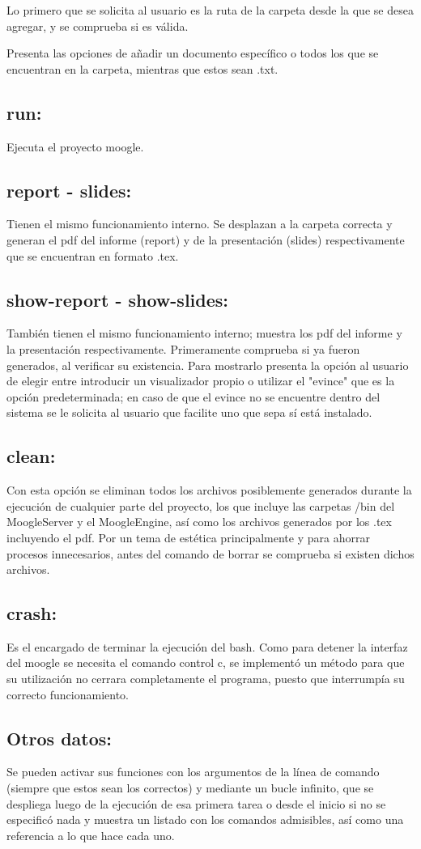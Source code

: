 \documentclass[a4paper,12pt,]{article}
\begin{document}
Lo primero que se solicita al usuario es la ruta de la carpeta desde la que se desea agregar, y se comprueba si 
es válida.

Presenta las opciones de añadir un documento específico o todos los que se encuentran en la carpeta, mientras que 
estos sean .txt.

\subsection*{run: }
Ejecuta el proyecto moogle.

\subsection*{report - slides: }
Tienen el mismo funcionamiento interno. Se desplazan a la carpeta correcta y generan el pdf del informe (report) y de 
la presentación (slides) respectivamente que se encuentran en formato .tex.

\subsection*{show-report - show-slides: }
También tienen el mismo funcionamiento interno; muestra los pdf del informe y la presentación respectivamente. 
Primeramente comprueba si ya fueron generados, al verificar su existencia. Para mostrarlo presenta la opción al 
usuario de elegir entre introducir un visualizador propio o utilizar el "evince" que es la opción predeterminada; 
en caso de que el evince no se encuentre dentro del sistema se le solicita al usuario que facilite uno que sepa sí 
está instalado.

\subsection*{clean: }
Con esta opción se eliminan todos los archivos posiblemente generados durante la ejecución de cualquier parte del 
proyecto, los que incluye las carpetas /bin del MoogleServer y el MoogleEngine, así como los archivos generados por 
los .tex incluyendo el pdf. Por un tema de estética principalmente y para ahorrar procesos innecesarios, antes del 
comando de borrar se comprueba si existen dichos archivos.

\subsection*{crash: }
Es el encargado de terminar la ejecución del bash. Como para detener la interfaz del moogle se necesita el comando 
control c, se implementó un método para que su utilización no cerrara completamente el programa, puesto que interrumpía 
su correcto funcionamiento.

\subsection*{Otros datos: }
Se pueden activar sus funciones con los argumentos de la línea de comando (siempre que estos sean los correctos) y mediante 
un bucle infinito, que se despliega luego de la ejecución de esa primera tarea o desde el inicio si no se especificó nada y 
muestra un listado con los comandos admisibles, así como una referencia a lo que hace cada uno.
\end{document}
